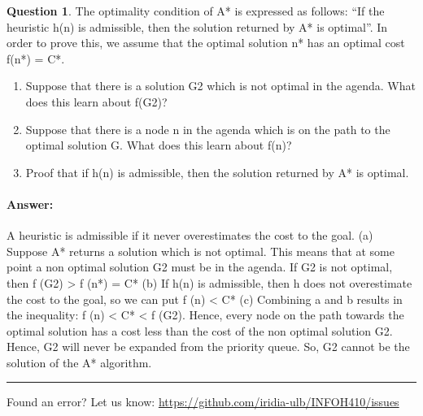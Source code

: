 \documentclass[11pt,a4paper]{article}
\theoremstyle{definition}%
\newtheorem{Q}{Question}[] %
\newcommand{\reponse}[1]{%
\ifthenelse {\boolean{corrige}} {\paragraph{Answer:} \color{darkblue}   #1\color{black}} {}
}
\begin{document}
\begin{Q}
    The optimality condition of A* is expressed as follows: “If the heuristic h(n) is admissible,
then the solution returned by A* is optimal”. In order to prove this, we assume that the
optimal solution n* has an optimal cost f(n*) = C*.

\begin{enumerate}
    \item Suppose that there is a solution G2 which is not optimal in the agenda. What does
    this learn about f(G2)?
    \item Suppose that there is a node n in the agenda which is on the path to the optimal
    solution G. What does this learn about f(n)?
    \item Proof that if h(n) is admissible, then the solution returned by A* is optimal.
\end{enumerate}
\reponse{
    A heuristic is admissible if it never overestimates the cost to the goal.
(a) Suppose A* returns a solution which is not optimal. This means that at some point a
non optimal solution G2 must be in the agenda. If G2 is not optimal, then f (G2) >
f (n*) = C*
(b) If h(n) is admissible, then h does not overestimate the cost to the goal, so we can put
f (n) < C*
(c) Combining a and b results in the inequality: f (n) < C* < f (G2). Hence, every node
on the path towards the optimal solution has a cost less than the cost of the non
optimal solution G2. Hence, G2 will never be expanded from the priority queue. So,
G2 cannot be the solution of the A* algorithm.
}
\end{Q}



\noindent
\rule{\textwidth}{0.4pt}
\footnotesize{Found an error? Let us know: \url{https://github.com/iridia-ulb/INFOH410/issues}}
\end{document}
